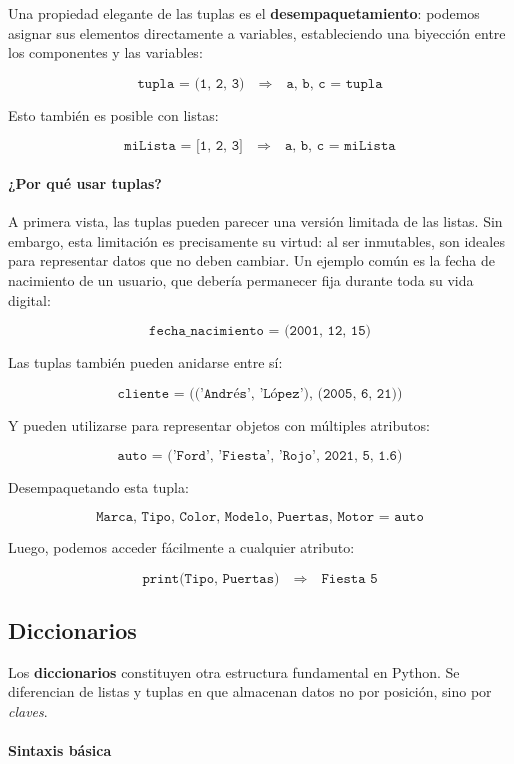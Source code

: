 \documentclass{article}
\theoremstyle{nonumberplain}
\begin{document}
Una propiedad elegante de las tuplas es el \textbf{desempaquetamiento}: podemos asignar sus elementos directamente a variables, estableciendo una biyección entre los componentes y las variables:

\[
\texttt{tupla = (1, 2, 3)} \quad \Rightarrow \quad \texttt{a, b, c = tupla}
\]

Esto también es posible con listas:

\[
\texttt{miLista = [1, 2, 3]} \quad \Rightarrow \quad \texttt{a, b, c = miLista}
\]

\paragraph{¿Por qué usar tuplas?}

A primera vista, las tuplas pueden parecer una versión limitada de las listas. Sin embargo, esta limitación es precisamente su virtud: al ser inmutables, son ideales para representar datos que no deben cambiar. Un ejemplo común es la fecha de nacimiento de un usuario, que debería permanecer fija durante toda su vida digital:

\[
\texttt{fecha\_nacimiento = (2001, 12, 15)}
\]

Las tuplas también pueden anidarse entre sí:

\[
\texttt{cliente = (('Andrés', 'López'), (2005, 6, 21))}
\]

Y pueden utilizarse para representar objetos con múltiples atributos:

\[
\texttt{auto = ('Ford', 'Fiesta', 'Rojo', 2021, 5, 1.6)}
\]

Desempaquetando esta tupla:

\[
\texttt{Marca, Tipo, Color, Modelo, Puertas, Motor = auto}
\]

Luego, podemos acceder fácilmente a cualquier atributo:

\[
\texttt{print(Tipo, Puertas)} \quad \Rightarrow \quad \texttt{Fiesta 5}
\]



\subsection*{Diccionarios}

Los \textbf{diccionarios} constituyen otra estructura fundamental en Python. Se diferencian de listas y tuplas en que almacenan datos no por posición, sino por \textit{claves}.

\paragraph{Sintaxis básica}
\end{document}
